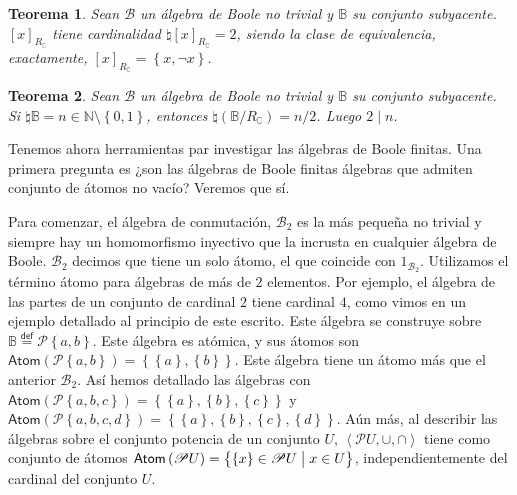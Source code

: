 \documentclass[final,12pt,a4paper,twoside,fleqn]{extbook}
\newcommand{\mathdef}{\ensuremath{\stackrel{\mathsf{def}}{{}={}}}}
\newcommand{\set}[1]{\ensuremath{\left\lbrace{#1}\right\rbrace}}
\newcommand {\setCompr}[2]{
	\ensuremath{
		\left\lbrace{ 
			#1 {\;\big{\vert}\;} #2
        }\right\rbrace
    }
}
\newcommand{\setN}{\ensuremath{\mathds{N}}}
\newcommand{\setB}{\ensuremath{\mathbb{B}}}
\newcommand{\algB}{\ensuremath{\mathscr{B}}}
\newtheorem{thm}{Teorema}[chapter]
\theoremstyle{definition}
\theoremstyle{remark}
\begin{document}
\begin{thm}
Sean \(\algB\) un álgebra de Boole no trivial y \(\setB\) su conjunto
subyacente. \({[x]}_{R_{\complement}}\) tiene cardinalidad
\(\natural{[x]}_{R_{\complement}}=2\), siendo la clase de equivalencia,
exactamente, \({[x]}_{R_{\complement}} = \set{x,\neg x}\).
\end{thm}



\begin{thm}
Sean \(\algB\) un álgebra de Boole no trivial y \(\setB\) su conjunto
subyacente. Si \(\natural\setB = n \in \setN\setminus\set{0,1}\), entonces
\(\natural\left(\setB / R_{\complement}\right) = n / 2\). Luego \(2 \mid n\).
\end{thm}



	Tenemos ahora herramientas par investigar las álgebras de Boole finitas.
Una primera pregunta es ¿son las álgebras de Boole finitas álgebras que
admiten conjunto de átomos no vacío? Veremos que sí.



	Para comenzar, el álgebra de conmutación, \(\algB_{2}\) es la más pequeña
no trivial y siempre hay un homomorfismo inyectivo que la incrusta en
cualquier álgebra de Boole. \(\algB_{2}\) decimos que tiene un solo átomo, el
que coincide con \(1_{{\algB}_{2}}\). Utilizamos el término átomo para
álgebras de más de \(2\) elementos. Por ejemplo, el álgebra de las partes de
un conjunto de cardinal \(2\) tiene cardinal \(4\), como vimos en un ejemplo
detallado al principio de este escrito. Este álgebra se construye sobre
\(\setB \mathdef \mathscr{P}\set{a, b}\). Este álgebra es atómica, y sus
átomos son \(\mathsf{Atom}\left(\mathscr{P}\set{a, b}\right) =
\set{\set{a},\set{b}}\). Este álgebra tiene un átomo más que el anterior
\({\algB}_{2}\). Así hemos detallado las álgebras con
\(\mathsf{Atom}\left(\mathscr{P}\set{a, b, c}\right) = \set{\set{a},\set{b},
\set{c}}\) y \(\mathsf{Atom}\left(\mathscr{P}\set{a, b, c, d}\right) =
\set{\set{a},\set{b}, \set{c}, \set{d}}\). Aún más, al describir las álgebras
sobre el conjunto potencia de un conjunto \(U\), \(\left\langle \mathscr{P}
U, \cup, \cap \right\rangle\) tiene como conjunto de átomos
\(\mathsf{Atom}\left(\mathscr{P} U\right) = \setCompr{\set{x} \in \mathscr{P}
U}{x \in U}\), independientemente del cardinal del conjunto \(U\).
\end{document}
